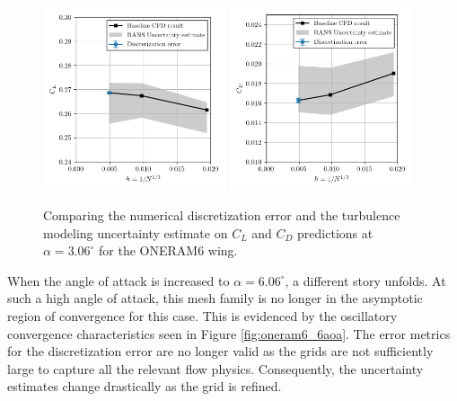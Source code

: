 \begin{figure}
\center
\subfigure%
  {\includegraphics[width=0.48\textwidth]{code/image_gen/oneram6/images/CL_03aoa.png}}
\subfigure%
  {\includegraphics[width=0.48\textwidth]{code/image_gen/oneram6/images/CD_03aoa.png}}
\caption{Comparing the numerical discretization error and the turbulence modeling uncertainty estimate on $C_L$ and $C_D$ predictions at $\alpha = 3.06^\circ$ for the ONERAM6 wing.}\label{fig:oneram6_3aoa}
\end{figure}

When the angle of attack is increased to $\alpha = 6.06^\circ$, a different story unfolds. 
At such a high angle of attack, this mesh family is no longer in the asymptotic region of convergence for this case. 
This is evidenced by the oscillatory convergence characteristics seen in Figure \ref{fig:oneram6_6aoa}.
The error metrics for the discretization error are no longer valid as the grids are not sufficiently large to capture all the relevant flow physics. 
Consequently, the uncertainty estimates change drastically as the grid is refined. 

